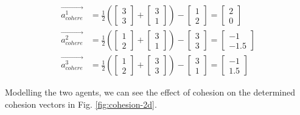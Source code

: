 \documentclass[12pt]{article}
\begin{document}
\begin{equation}
    \begin{aligned}
        \vec{a_{cohere}^1} &= \frac{1}{2} \left( \begin{bmatrix} 3 \\ 3 \end{bmatrix} + \begin{bmatrix} 3 \\ 1 \end{bmatrix} \right) - \begin{bmatrix} 1 \\ 2 \end{bmatrix} = \begin{bmatrix} 2 \\ 0 \end{bmatrix}
        \\
        \vec{a_{cohere}^2} &= \frac{1}{2} \left( \begin{bmatrix} 1 \\ 2 \end{bmatrix} + \begin{bmatrix} 3 \\ 1 \end{bmatrix} \right) - \begin{bmatrix} 3 \\ 3 \end{bmatrix} = \begin{bmatrix} -1 \\ -1.5 \end{bmatrix}
        \\
        \vec{a_{cohere}^3} &= \frac{1}{2} \left( \begin{bmatrix} 1 \\ 2 \end{bmatrix} + \begin{bmatrix} 3 \\ 3 \end{bmatrix} \right) - \begin{bmatrix} 3 \\ 1 \end{bmatrix} = \begin{bmatrix} -1 \\ 1.5 \end{bmatrix}
    \end{aligned}
\end{equation}

Modelling the two agents, we can see the effect of cohesion on the determined cohesion vectors in Fig. \ref{fig:cohesion-2d}. 
\end{document}
